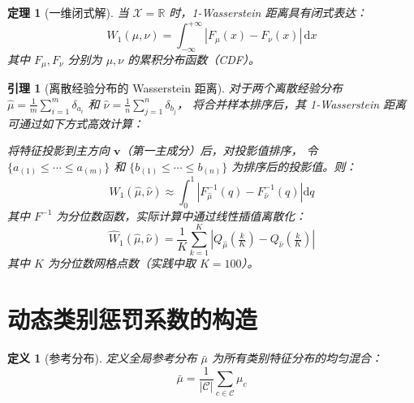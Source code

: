 \documentclass[12pt, a4paper]{ctexart}
\newtheorem{definition}{定义}[section]
\newtheorem{theorem}{定理}[section]
\newtheorem{lemma}{引理}[section]
\begin{document}
\begin{theorem}[一维闭式解]
\label{thm:1d_wasserstein}
当 $\mathcal{X} = \mathbb{R}$ 时，1-Wasserstein 距离具有闭式表达：
\begin{equation}
    W_1(\mu, \nu) = \int_{-\infty}^{+\infty} |F_\mu(x) - F_\nu(x)| \, \mathrm{d}x
    \label{eq:wasserstein_1d}
\end{equation}
其中 $F_\mu, F_\nu$ 分别为 $\mu, \nu$ 的累积分布函数（CDF）。
\end{theorem}

\begin{lemma}[离散经验分布的 Wasserstein 距离]
\label{lem:discrete_wasserstein}
对于两个离散经验分布 $\hat{\mu} = \frac{1}{m}\sum_{i=1}^{m} \delta_{a_i}$
和 $\hat{\nu} = \frac{1}{n}\sum_{j=1}^{n} \delta_{b_j}$，
将合并样本排序后，其 1-Wasserstein 距离可通过如下方式高效计算：

将特征投影到主方向 $\bm{v}$（第一主成分）后，对投影值排序，
令 $\{a_{(1)} \leq \cdots \leq a_{(m)}\}$ 和 $\{b_{(1)} \leq \cdots \leq b_{(n)}\}$
为排序后的投影值。则：
\begin{equation}
    W_1(\hat{\mu}, \hat{\nu}) \approx
    \int_0^1 \left| F_{\hat{\mu}}^{-1}(q) - F_{\hat{\nu}}^{-1}(q) \right| \mathrm{d}q
    \label{eq:discrete_wasserstein}
\end{equation}
其中 $F^{-1}$ 为分位数函数，实际计算中通过线性插值离散化：
\begin{equation}
    \hat{W}_1(\hat{\mu}, \hat{\nu}) = \frac{1}{K} \sum_{k=1}^{K}
    \left| Q_{\hat{\mu}}\!\left(\tfrac{k}{K}\right) - Q_{\hat{\nu}}\!\left(\tfrac{k}{K}\right) \right|
    \label{eq:quantile_approx}
\end{equation}
其中 $K$ 为分位数网格点数（实践中取 $K = 100$）。
\end{lemma}

\section{动态类别惩罚系数的构造}

\begin{definition}[参考分布]
定义全局参考分布 $\bar{\mu}$ 为所有类别特征分布的均匀混合：
\begin{equation}
    \bar{\mu} = \frac{1}{|\mathcal{C}|} \sum_{c \in \mathcal{C}} \mu_c
    \label{eq:reference_dist}
\end{equation}
\end{definition}
\end{document}
